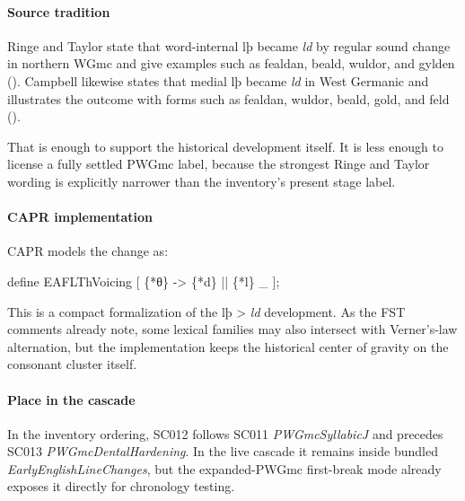 \documentclass[
  british,
  a4paper,
]{article}
\newenvironment{Shaded}{}{}
\newcommand{\NormalTok}[1]{#1}
\begin{document}
\paragraph{Source tradition}\label{source-tradition-9}

Ringe and Taylor state that word-internal lþ became \emph{ld} by regular
sound change in northern WGmc and give examples such as fealdan, beald,
wuldor, and gylden (). Campbell likewise states that medial lþ became
\emph{ld} in West Germanic and illustrates the outcome with forms such
as fealdan, wuldor, beald, gold, and feld
().

That is enough to support the historical development itself. It is less
enough to license a fully settled PWGmc label, because the strongest
Ringe and Taylor wording is explicitly narrower than the inventory's
present stage label.

\paragraph{CAPR implementation}\label{capr-implementation-9}

CAPR models the change as:

\begin{Shaded}
\begin{Highlighting}[]
\NormalTok{define EAFLThVoicing [}
\NormalTok{    \{*θ\} {-}\textgreater{} \{*d\} || \{*l\} \_}
\NormalTok{];}
\end{Highlighting}
\end{Shaded}

This is a compact formalization of the lþ \textgreater{} \emph{ld}
development. As the FST comments already note, some lexical families may
also intersect with Verner's-law alternation, but the implementation
keeps the historical center of gravity on the consonant cluster itself.

\paragraph{Place in the cascade}\label{place-in-the-cascade-9}

In the inventory ordering, SC012 follows SC011 \emph{PWGmcSyllabicJ} and
precedes SC013 \emph{PWGmcDentalHardening}. In the live cascade it
remains inside bundled \emph{EarlyEnglishLineChanges}, but the
expanded-PWGmc first-break mode already exposes it directly for
chronology testing.
\end{document}
